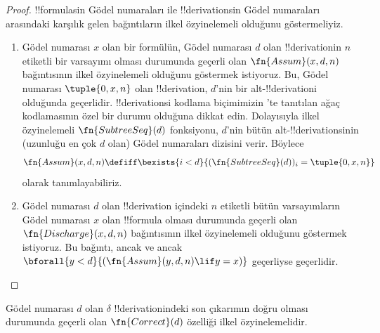 \begin{proof}
  !!{formula}s{}in Gödel numaraları ile !!{derivation}s{}in Gödel numaraları
  arasındaki karşılık gelen bağıntıların ilkel özyinelemeli olduğunu
  göstermeliyiz.
  \begin{enumerate}
  \item Gödel numarası $x$ olan bir formülün, Gödel numarası $d$ olan
    !!{derivation}{}in $n$ etiketli bir varsayımı olması durumunda geçerli olan
    $\fn{Assum}(x, d, n)$ bağıntısının ilkel özyinelemeli olduğunu göstermek
    istiyoruz. Bu, Gödel numarası $\tuple{0, x, n}$ olan !!{derivation},
    $d$'nin bir alt-!!{derivation}{}i olduğunda geçerlidir. !!{derivation}s{}i
    kodlama biçimimizin 'te tanıtılan ağaç
    kodlamasının özel bir durumu olduğuna dikkat edin. Dolayısıyla ilkel
    özyinelemeli $\fn{SubtreeSeq}(d)$ fonksiyonu, $d$'nin bütün
    alt-!!{derivation}s{}inin (uzunluğu en çok $d$ olan) Gödel numaraları
    dizisini verir. Böylece
    \[
    \fn{Assum}(x, d, n) \defiff \bexists{i<d}{(\fn{SubtreeSeq}(d))_i =
      \tuple{0, x, n}}
    \]
    olarak tanımlayabiliriz.
  \item Gödel numarası $d$ olan !!{derivation} içindeki $n$ etiketli bütün
    varsayımların Gödel numarası $x$ olan !!{formula} olması durumunda geçerli
    olan $\fn{Discharge}(x, d, n)$ bağıntısının ilkel özyinelemeli olduğunu
    göstermek istiyoruz. Bu bağıntı, ancak ve ancak
    $\bforall{y<d}{(\fn{Assum}(y, d, n) \lif y = x)}$ geçerliyse geçerlidir.
  \end{enumerate}
\end{proof}

\begin{prop}
  Gödel numarası $d$ olan $\delta$ !!{derivation}{}indeki son çıkarımın doğru
  olması durumunda geçerli olan $\fn{Correct}(d)$ özelliği ilkel
  özyinelemelidir.
\end{prop}

